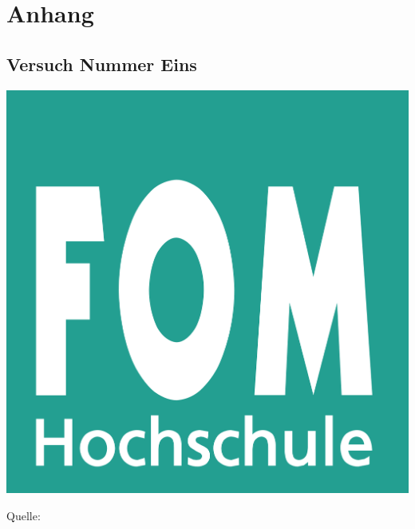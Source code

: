 \chapter{Anhang}
\renewcommand\thesection{Anhang \arabic{section}:} %

\begin{minipage}{\textwidth}
	\section{Versuch Nummer Eins}
	\label{anh:versuch_nummer_eins}
	\includegraphics[width=0.5\linewidth]{Abbildungen/fom_logo.png} 
	\par\smallskip
	Quelle: \cite{logo}
\end{minipage}

\renewcommand\thesection{\thechapter.\arabic{section}}